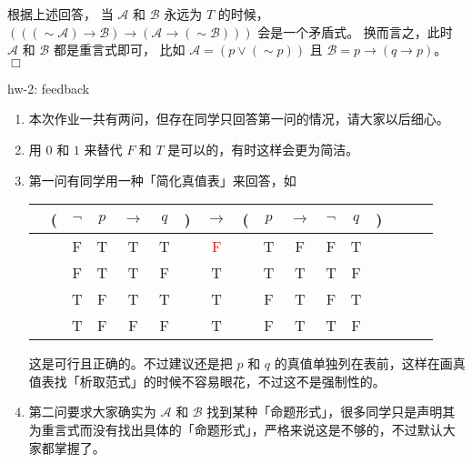\documentclass[UTF8,12pt,a4paper]{ctexart}
\newcommand{\negs}{\sim\!}
\begin{document}
根据上述回答，
当  $\mathscr{A}$ 和 $\mathscr{B}$ 永远为 $T$ 的时候，
$(((\negs \mathscr{A}) \to \mathscr{B})  \to (\mathscr{A} \to (\negs \mathscr{B})))$ 会是一个矛盾式。
换而言之，此时
$\mathscr{A}$ 和  $\mathscr{B}$ 都是重言式即可，
比如 
$\mathscr{A} = (p \lor  (\negs p))$ 且 $\mathscr{B} = p \to (q \to p)$。
\hfill $\Box$


\vspace{1em}
\dotfill hw-2: feedback
\dotfill

\begin{enumerate}
\item 本次作业一共有两问，但存在同学只回答第一问的情况，请大家以后细心。
	
\item 用 $0$ 和 $1$ 来替代 $F$ 和 $T$ 是可以的，有时这样会更为简洁。
	
\item 第一问有同学用一种「简化真值表」来回答，如
\begin{center} 
	\begin{tabular}{@{ }c@{ }@{ }c  c@{ }@{}c@{}@{ }c@{ }@{ }c@{ }@{ }c@{ }@{ }c@{ }@{}c@{}@{ }c@{ }@{}c@{}@{ }c@{ }@{ }c@{ }@{ }c@{ }@{ }c@{ }@{}c@{}@{ }c}
	& ( & $\lnot$ & $p$ & $\rightarrow$ & $q$ & ) & $\rightarrow$ & ( & $p$ & $\rightarrow$ & $\lnot$ & $q$ & ) & \\
	\hline 
	&  & F & T & T & T &  & \textcolor{red}{F} &  & T & F & F & T &  & \\
	&  & F & T & T & F &  & {T} &  & T & T & T & F &  & \\
	&  & T & F & T & T &  & {T} &  & F & T & F & T &  & \\
	&  & T & F & F & F &  & {T} &  & F & T & T & F &  & \\
	\end{tabular}
\end{center}
这是可行且正确的。不过建议还是把 $p$ 和 $q$ 的真值单独列在表前，这样在画真值表找「析取范式」的时候不容易眼花，不过这不是强制性的。
	
\item 第二问要求大家确实为 $\mathscr{A}$ 和 $\mathscr{B}$ 找到某种「命题形式」，很多同学只是声明其为重言式而没有找出具体的「命题形式」，严格来说这是不够的，不过默认大家都掌握了。
\end{enumerate}
\end{document}
